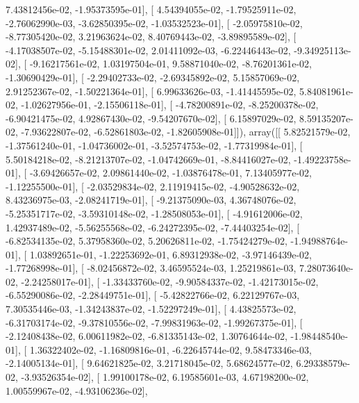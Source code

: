 \documentclass{article}
\begin{document}
          7.43812456e-02,  -1.95373595e-01],
       [  4.54394055e-02,  -1.79525911e-02,  -2.76062990e-03,
         -3.62850395e-02,  -1.03532523e-01],
       [ -2.05975810e-02,  -8.77305420e-02,   3.21963624e-02,
          8.40769443e-02,  -3.89895589e-02],
       [ -4.17038507e-02,  -5.15488301e-02,   2.01411092e-03,
         -6.22446443e-02,  -9.34925113e-02],
       [ -9.16217561e-02,   1.03197504e-01,   9.58871040e-02,
         -8.76201361e-02,  -1.30690429e-01],
       [ -2.29402733e-02,  -2.69345892e-02,   5.15857069e-02,
          2.91252367e-02,  -1.50221364e-01],
       [  6.99633626e-03,  -1.41445595e-02,   5.84081961e-02,
         -1.02627956e-01,  -2.15506118e-01],
       [ -4.78200891e-02,  -8.25200378e-02,  -6.90421475e-02,
          4.92867430e-02,  -9.54207670e-02],
       [  6.15897029e-02,   8.59135207e-02,  -7.93622807e-02,
         -6.52861803e-02,  -1.82605908e-01]]), array([[  5.82521579e-02,  -1.37561240e-01,  -1.04736002e-01,
         -3.52574753e-02,  -1.77319984e-01],
       [  5.50184218e-02,  -8.21213707e-02,  -1.04742669e-01,
         -8.84416027e-02,  -1.49223758e-01],
       [ -3.69426657e-02,   2.09861440e-02,  -1.03876478e-01,
          7.13405977e-02,  -1.12255500e-01],
       [ -2.03529834e-02,   2.11919415e-02,  -4.90528632e-02,
          8.43236975e-03,  -2.08241719e-01],
       [ -9.21375090e-03,   4.36748076e-02,  -5.25351717e-02,
         -3.59310148e-02,  -1.28508053e-01],
       [ -4.91612006e-02,   1.42937489e-02,  -5.56255568e-02,
         -6.24272395e-02,  -7.44403254e-02],
       [ -6.82534135e-02,   5.37958360e-02,   5.20626811e-02,
         -1.75424279e-02,  -1.94988764e-01],
       [  1.03892651e-01,  -1.22253692e-01,   6.89312938e-02,
         -3.97146439e-02,  -1.77268998e-01],
       [ -8.02456872e-02,   3.46595524e-03,   1.25219861e-03,
          7.28073640e-02,  -2.24258017e-01],
       [ -1.33433760e-02,  -9.90584337e-02,  -1.42173015e-02,
         -6.55290086e-02,  -2.28449751e-01],
       [ -5.42822766e-02,   6.22129767e-03,   7.30535446e-03,
         -1.34243837e-02,  -1.52297249e-01],
       [  4.43825573e-02,  -6.31703174e-02,  -9.37810556e-02,
         -7.99831963e-02,  -1.99267375e-01],
       [ -2.12408438e-02,   6.00611982e-02,  -6.81335143e-02,
          1.30764644e-02,  -1.98448540e-01],
       [  1.36322402e-02,  -1.16809816e-01,  -6.22645744e-02,
          9.58473346e-03,  -2.14005134e-01],
       [  9.64621825e-02,   3.21718045e-02,   5.68624577e-02,
          6.29338579e-02,  -3.93526354e-02],
       [  1.99100178e-02,   6.19585601e-03,   4.67198200e-02,
          1.00559967e-02,  -4.93106236e-02],
\end{document}
